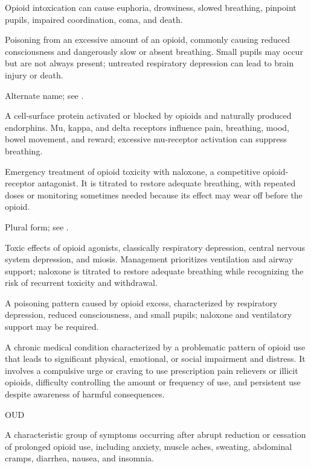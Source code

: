  Opioid intoxication can cause euphoria, drowsiness, slowed breathing, pinpoint pupils, impaired coordination, coma, and death.

 Poisoning from an excessive amount of an opioid, commonly causing reduced consciousness and dangerously slow or absent breathing. Small pupils may occur but are not always present; untreated respiratory depression can lead to brain injury or death.

 Alternate name; see .

 A cell-surface protein activated or blocked by opioids and naturally produced endorphins. Mu, kappa, and delta receptors influence pain, breathing, mood, bowel movement, and reward; excessive mu-receptor activation can suppress breathing.

 Emergency treatment of opioid toxicity with naloxone, a competitive opioid-receptor
antagonist. It is titrated to restore adequate breathing, with repeated doses or monitoring sometimes needed because
its effect may wear off before the opioid.

 Plural form; see .

 Toxic effects of opioid agonists, classically respiratory depression, central nervous
system depression, and miosis. Management prioritizes ventilation and airway support;
naloxone is titrated to restore adequate breathing while recognizing the risk of
recurrent toxicity and withdrawal.

 A poisoning pattern caused by opioid excess, characterized by respiratory depression, reduced consciousness, and small pupils; naloxone and ventilatory support may be required.

 A chronic medical condition characterized by a problematic pattern of opioid use that leads to significant physical, emotional, or social impairment and distress. It involves a compulsive urge or craving to use prescription pain relievers or illicit opioids, difficulty controlling the amount or frequency of use, and persistent use despite awareness of harmful consequences.

\synonyms
OUD

 A characteristic group of symptoms occurring after abrupt reduction or cessation of prolonged opioid use, including anxiety, muscle aches, sweating, abdominal cramps, diarrhea, nausea, and insomnia.

